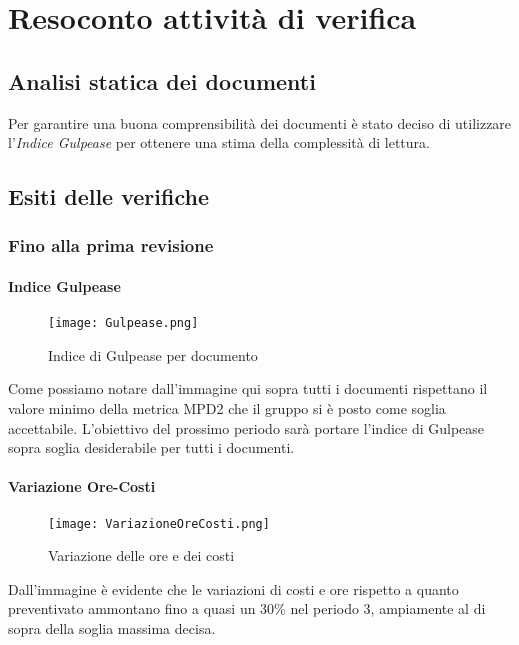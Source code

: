 \chapter{Resoconto attività di verifica}
\section{Analisi statica dei documenti}
Per garantire una buona comprensibilità dei documenti è stato deciso di utilizzare l'\textit{Indice Gulpease} per ottenere una stima della complessità di lettura.
\section{Esiti delle verifiche}
    \subsection{Fino alla prima revisione}
      \subsubsection{Indice Gulpease}  
        \begin{figure}[h!]
            \centering
            \texttt{[image: Gulpease.png]}
            \caption{Indice di Gulpease per documento}
        \end{figure}
        Come possiamo notare dall'immagine qui sopra tutti i documenti rispettano il valore minimo della metrica MPD2 che il gruppo si è posto come soglia accettabile. L'obiettivo del prossimo periodo sarà portare l'indice di Gulpease sopra soglia desiderabile per tutti i documenti. 
      \subsubsection{Variazione Ore-Costi}  
        \begin{figure}[h!]
            \centering
            \texttt{[image: VariazioneOreCosti.png]}
            \caption{Variazione delle ore e dei costi}
        \end{figure}
        Dall'immagine è evidente che le variazioni di costi e ore rispetto a quanto preventivato ammontano fino a quasi un 30\% nel periodo 3, ampiamente al di sopra della soglia massima decisa.
